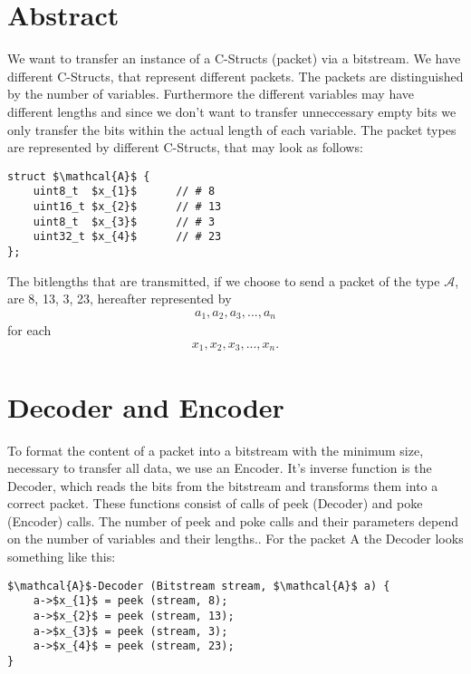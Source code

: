 \documentclass{article}
\begin{document}
	\section{Abstract}
		We want to transfer an instance of a C-Structs (packet) via a bitstream. We have different C-Structs, that represent different packets. The packets are distinguished by the number of variables.
		Furthermore the different variables may have different lengths and since we don't want to transfer unneccessary empty bits we only transfer the bits within the actual length of each variable.
		The packet types are represented by different C-Structs, that may look as follows:
		\begin{lstlisting}[mathescape]
struct $\mathcal{A}$ {
	uint8_t  $x_{1}$      // # 8
	uint16_t $x_{2}$      // # 13
	uint8_t  $x_{3}$      // # 3
	uint32_t $x_{4}$      // # 23
};
		\end{lstlisting}
		The bitlengths that are transmitted, if we choose to send a packet of the type $\mathcal{A}$, are 8, 13, 3, 23, hereafter represented by 
		\begin{align*}
			a_{1}, a_{2}, a_{3}, ... , a_{n}
		\end{align*}
		for each
		\begin{align*}
			x_{1}, x_{2}, x_{3}, ... , x_{n}.
		\end{align*}
	\section{Decoder and Encoder}
		To format the content of a packet into a bitstream with the minimum size, necessary to transfer all data, we use an Encoder. It's inverse function is the Decoder, which reads the bits
		from the bitstream and transforms them into a correct packet.
		These functions consist of calls of peek (Decoder) and poke (Encoder) calls. The number of peek and poke calls and their parameters depend on the number of variables and their lengths..
		For the packet A the Decoder looks something like this:
		\begin{lstlisting}[mathescape]
$\mathcal{A}$-Decoder (Bitstream stream, $\mathcal{A}$ a) {
	a->$x_{1}$ = peek (stream, 8);
	a->$x_{2}$ = peek (stream, 13);
	a->$x_{3}$ = peek (stream, 3);
	a->$x_{4}$ = peek (stream, 23);
}
		\end{lstlisting}
\end{document}
